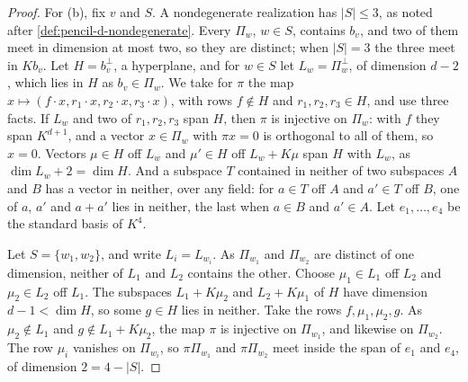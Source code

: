 \begin{proof}
  For (b), fix $v$ and $S$. A nondegenerate realization has
  $|S| \le 3$, as noted after \cref{def:pencil-d-nondegenerate}. Every
  $\Pi_w$, $w \in S$, contains $b_v$, and two of them meet in dimension
  at most two, so they are distinct; when $|S| = 3$ the three meet in
  $K b_v$. Let $H = b_v^{\perp}$, a hyperplane, and for $w \in S$ let
  $L_w = \Pi_w^{\perp}$, of dimension $d - 2$, which lies in $H$ as
  $b_v \in \Pi_w$. We take for $\pi$ the map
  $x \mapsto (f \cdot x, r_1 \cdot x, r_2 \cdot x, r_3 \cdot x)$, with
  rows $f \notin H$ and $r_1, r_2, r_3 \in H$, and use three facts. If
  $L_w$ and two of $r_1, r_2, r_3$ span $H$, then $\pi$ is injective on
  $\Pi_w$: with $f$ they span $K^{d+1}$, and a vector $x \in \Pi_w$ with
  $\pi x = 0$ is orthogonal to all of them, so $x = 0$. Vectors
  $\mu \in H$ off $L_w$ and $\mu' \in H$ off $L_w + K\mu$ span $H$ with
  $L_w$, as $\dim L_w + 2 = \dim H$. And a subspace $T$ contained in
  neither of two subspaces $A$ and $B$ has a vector in neither, over any
  field: for $a \in T$ off $A$ and $a' \in T$ off $B$, one of $a$, $a'$
  and $a + a'$ lies in neither, the last when $a \in B$ and $a' \in A$.
  Let $e_1, \dots, e_4$ be the standard basis of $K^4$.

  Let $S = \{w_1, w_2\}$, and write $L_i = L_{w_i}$. As $\Pi_{w_1}$ and
  $\Pi_{w_2}$ are distinct of one dimension, neither of $L_1$ and $L_2$
  contains the other. Choose $\mu_1 \in L_1$ off $L_2$ and
  $\mu_2 \in L_2$ off $L_1$. The subspaces $L_1 + K\mu_2$ and
  $L_2 + K\mu_1$ of $H$ have dimension $d - 1 < \dim H$, so some
  $g \in H$ lies in neither. Take the rows $f, \mu_1, \mu_2, g$. As
  $\mu_2 \notin L_1$ and $g \notin L_1 + K\mu_2$, the map $\pi$ is
  injective on $\Pi_{w_1}$, and likewise on $\Pi_{w_2}$. The row $\mu_i$
  vanishes on $\Pi_{w_i}$, so $\pi\Pi_{w_1}$ and $\pi\Pi_{w_2}$ meet
  inside the span of $e_1$ and $e_4$, of dimension $2 = 4 - |S|$.


\end{proof}
